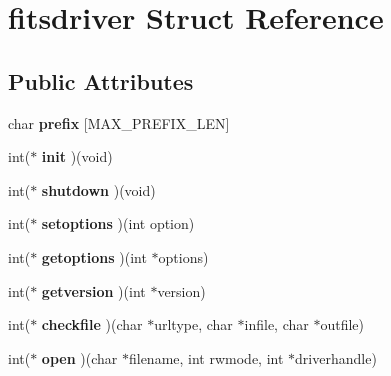 \hypertarget{structfitsdriver}{}\section{fitsdriver Struct Reference}
\label{structfitsdriver}
\subsection*{Public Attributes}
\begin{DoxyCompactItemize}
\item 
\mbox{\label{structfitsdriver_ad96b8ecfeb05adc039a9dc51e949b967}} 
char {\bfseries prefix} \mbox{[}M\+A\+X\+\_\+\+P\+R\+E\+F\+I\+X\+\_\+\+L\+EN\mbox{]}
\item 
\mbox{\label{structfitsdriver_a2307b9ec445633d85eca243e9bb7e1d9}} 
int($\ast$ {\bfseries init} )(void)
\item 
\mbox{\label{structfitsdriver_a5cdc0fc314f6eef68b2b8b5cd55990e4}} 
int($\ast$ {\bfseries shutdown} )(void)
\item 
\mbox{\label{structfitsdriver_aca7908ef0ad3915392172e60e18985af}} 
int($\ast$ {\bfseries setoptions} )(int option)
\item 
\mbox{\label{structfitsdriver_a291c6e953d90bd43aba4aa0cc7f02c75}} 
int($\ast$ {\bfseries getoptions} )(int $\ast$options)
\item 
\mbox{\label{structfitsdriver_a55bbfcd142114d3eb2b8288051b8fe1b}} 
int($\ast$ {\bfseries getversion} )(int $\ast$version)
\item 
\mbox{\label{structfitsdriver_a7c77c2fde8e33578cd398727e2267e8a}} 
int($\ast$ {\bfseries checkfile} )(char $\ast$urltype, char $\ast$infile, char $\ast$outfile)
\item 
\mbox{\label{structfitsdriver_ad7b89b762fdcc309d37a9e151a469724}} 
int($\ast$ {\bfseries open} )(char $\ast$filename, int rwmode, int $\ast$driverhandle)
\item 
\mbox{\label{structfitsdriver_af417da770429628647a32210a408f0cf}} 

\end{DoxyCompactItemize}
